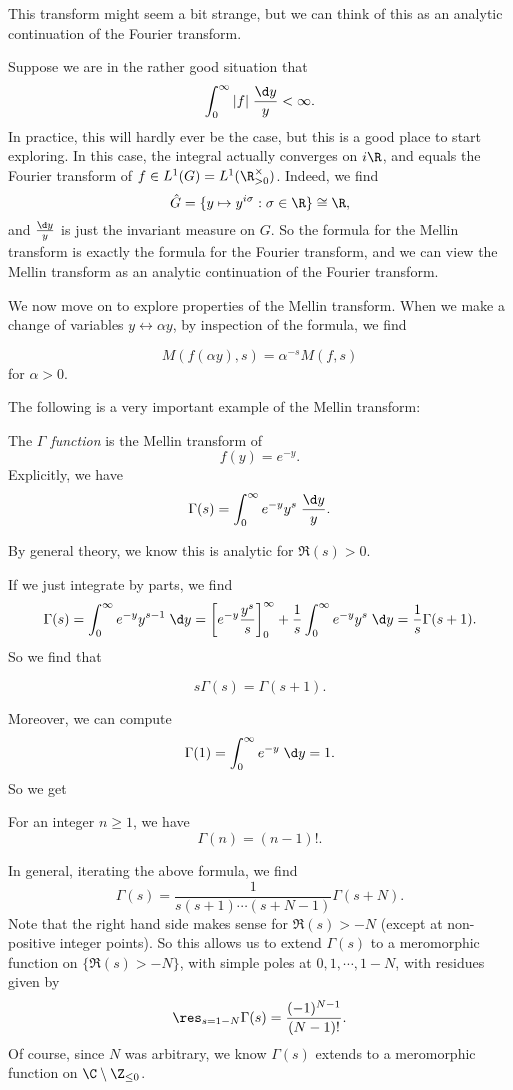 \documentclass[a4paper]{article}
\begin{document}
This transform might seem a bit strange, but we can think of this as an analytic continuation of the Fourier transform.
\begin{eg}
  Suppose we are in the rather good situation that
  \[
    \int_0^\infty |f| \;\frac{\d y}{y} < \infty.
  \]
  In practice, this will hardly ever be the case, but this is a good place to start exploring. In this case, the integral actually converges on $i\R$, and equals the Fourier transform of $f \in L^1(G) = L^1(\R^\times_{>0})$. Indeed, we find
  \[
    \hat{G} = \{y \mapsto y^{i\sigma} : \sigma \in \R\} \cong \R,
  \]
  and $\frac{\d y}{y}$ is just the invariant measure on $G$. So the formula for the Mellin transform is exactly the formula for the Fourier transform, and we can view the Mellin transform as an analytic continuation of the Fourier transform.
\end{eg}
We now move on to explore properties of the Mellin transform. When we make a change of variables $y \leftrightarrow \alpha y$, by inspection of the formula, we find
\begin{prop}
  \[
    M(f(\alpha y), s) = \alpha^{-s} M(f, s)
  \]
  for $\alpha > 0$.
\end{prop}

The following is a very important example of the Mellin transform:
\begin{defi}
  The \emph{$\Gamma$ function} is the Mellin transform of
  \[
    f(y) = e^{-y}.
  \]
  Explicitly, we have
  \[
    \Gamma(s) = \int_0^\infty e^{-y} y^s \;\frac{\d y}{y}.
  \]
\end{defi}
By general theory, we know this is analytic for $\Re(s) > 0$.

If we just integrate by parts, we find
\[
  \Gamma(s) = \int_0^\infty e^{-y} y^{s - 1}\;\d y = \left[e^{-y} \frac{y^s}{s} \right]_0^\infty + \frac{1}{s}\int_0^\infty e^{-y} y^s \;\d y = \frac{1}{s}\Gamma(s + 1).
\]
So we find that
\begin{prop}
  \[
    s \Gamma(s) = \Gamma(s + 1).
  \]
\end{prop}
Moreover, we can compute
\[
  \Gamma(1) = \int_0^\infty e^{-y}\;\d y = 1.
\]
So we get
\begin{prop}
  For an integer $n \geq 1$, we have
  \[
    \Gamma(n) = (n - 1)!.
  \]
\end{prop}
In general, iterating the above formula, we find
\[
  \Gamma(s) = \frac{1}{s (s + 1) \cdots (s + N - 1)} \Gamma(s + N).
\]
Note that the right hand side makes sense for $\Re(s) > -N$ (except at non-positive integer points). So this allows us to extend $\Gamma(s)$ to a meromorphic function on $\{\Re(s) > -N\}$, with simple poles at $0, 1, \cdots, 1 - N$, with residues given by
\[
  \res_{s = 1 - N} \Gamma(s) = \frac{(-1)^{N - 1}}{(N - 1)!}.
\]
Of course, since $N$ was arbitrary, we know $\Gamma(s)$ extends to a meromorphic function on $\C \setminus \Z_{\leq 0}$.
\end{document}
